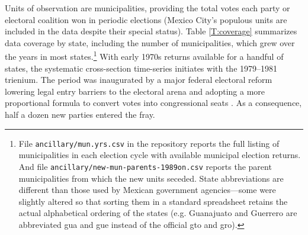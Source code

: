 \documentclass[letter,12pt]{article}
\begin{document}
Units of observation are municipalities, providing the total votes each party or electoral coalition won in periodic elections (Mexico City's populous units are included in the data despite their special status). Table \ref{T:coverage} summarizes data coverage by state, including the number of municipalities, which grew over the years in most states.\footnote{File \verb|ancillary/mun.yrs.csv| in the repository reports the full listing of municipalities in each election cycle with available municipal election returns. And file \verb|ancillary/new-mun-parents-1989on.csv| reports the parent municipalities from which the new units seceded. State abbreviations are different than those used by Mexican government agencies---some were slightly altered so that sorting them in a standard spreadsheet retains the actual alphabetical ordering of the states (e.g. Guanajuato and Guerrero are abbreviated gua and gue instead of the official gto and gro).} With early 1970s returns available for a handful of states, the systematic cross-section time-series initiates with the 1979--1981 trienium. The period was inaugurated by a major federal electoral reform lowering legal entry barriers to the electoral arena and adopting a more proportional formula to convert votes into congressional seats \citep[:116]{molinar.1991a}. As a consequence, half a dozen new parties entered the fray. 
\end{document}

